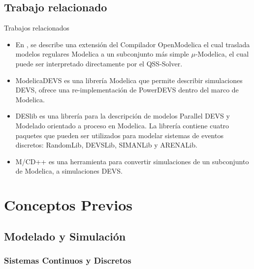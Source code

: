 \documentclass{beamer}
\newcommand{\customcite}[1]{\citetitle{#1}, \citeyear{#1}}
\begin{document}
\section{Trabajo relacionado}
\begin{frame}{Trabajos relacionados}
\begin{itemize}
	\item<1-> En \customcite{Ber12} se describe una extensión del Compilador OpenModelica el cual traslada modelos regulares Modelica a un subconjunto más simple $\mu$-Modelica, el cual puede ser interpretado directamente por el QSS-Solver.

	\item<2-> ModelicaDEVS es una librería Modelica que permite describir simulaciones DEVS, ofrece una re-implementación de PowerDEVS dentro del marco de Modelica.

	\item<3-> DESlib es una librería para la descripción de modelos Parallel DEVS y Modelado orientado a proceso en Modelica.
La librería contiene cuatro paquetes que pueden ser utilizados para modelar sistemas de eventos discretos: RandomLib, DEVSLib, SIMANLib y ARENALib.

	\item<4-> M/CD++ es una herramienta para convertir simulaciones de un subconjunto de Modelica, a simulaciones DEVS.
\end{itemize}
\end{frame}

\chapter{Conceptos Previos}
\section{Modelado y Simulación}
\subsection{Sistemas Continuos y Discretos}
\end{document}
